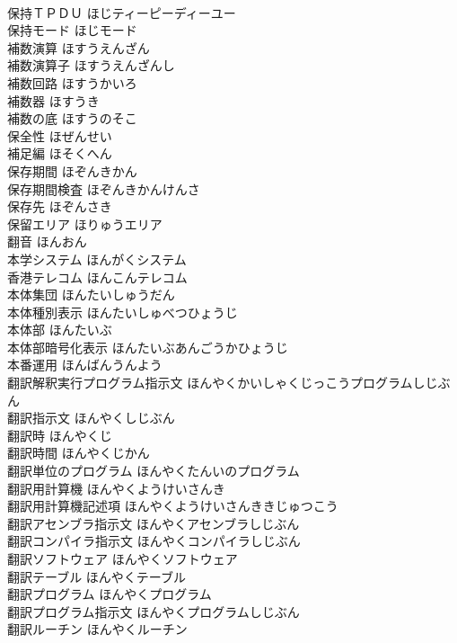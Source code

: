 \documentclass[8pt]{extreport}
\begin{document}
\begin{CJK}{UTF8}{min}
\\	保持ＴＰＤＵ	ほじティーピーディーユー	
\\	保持モード	ほじモード	
\\	補数演算	ほすうえんざん	
\\	補数演算子	ほすうえんざんし	
\\	補数回路	ほすうかいろ	
\\	補数器	ほすうき	
\\	補数の底	ほすうのそこ	
\\	保全性	ほぜんせい	
\\	補足編	ほそくへん	
\\	保存期間	ほぞんきかん	
\\	保存期間検査	ほぞんきかんけんさ	
\\	保存先	ほぞんさき	
\\	保留エリア	ほりゅうエリア	
\\	翻音	ほんおん	
\\	本学システム	ほんがくシステム	
\\	香港テレコム	ほんこんテレコム	
\\	本体集団	ほんたいしゅうだん	
\\	本体種別表示	ほんたいしゅべつひょうじ	
\\	本体部	ほんたいぶ	
\\	本体部暗号化表示	ほんたいぶあんごうかひょうじ	
\\	本番運用	ほんばんうんよう	
\\	翻訳解釈実行プログラム指示文	ほんやくかいしゃくじっこうプログラムしじぶん	
\\	翻訳指示文	ほんやくしじぶん	
\\	翻訳時	ほんやくじ	
\\	翻訳時間	ほんやくじかん	
\\	翻訳単位のプログラム	ほんやくたんいのプログラム	
\\	翻訳用計算機	ほんやくようけいさんき	
\\	翻訳用計算機記述項	ほんやくようけいさんききじゅつこう	
\\	翻訳アセンブラ指示文	ほんやくアセンブラしじぶん	
\\	翻訳コンパイラ指示文	ほんやくコンパイラしじぶん	
\\	翻訳ソフトウェア	ほんやくソフトウェア	
\\	翻訳テーブル	ほんやくテーブル	
\\	翻訳プログラム	ほんやくプログラム	
\\	翻訳プログラム指示文	ほんやくプログラムしじぶん	
\\	翻訳ルーチン	ほんやくルーチン	

\end{CJK}
\end{document}
